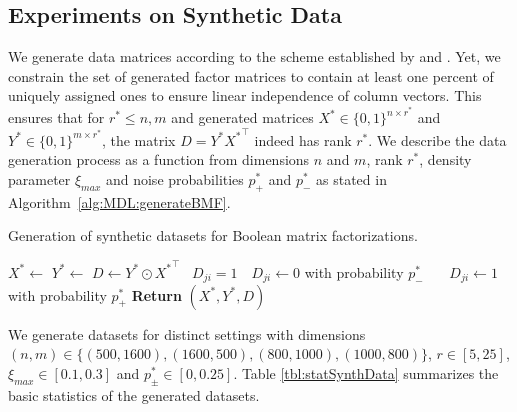 \subsection{Experiments on Synthetic Data} \label{sec:MDL:SynthData}
We generate data matrices according to the scheme established by \cite{miettinen2014mdl4bmf,karaev2015getting} and \cite{lucchese2014unifying}. Yet, we constrain the set of generated factor matrices to contain at least one percent of uniquely assigned ones to ensure linear independence of column vectors. This ensures that for $r^*\leq n,m$ and generated matrices $X^*\in\{0,1\}^{n\times r^*}$ and $Y^*\in\{0,1\}^{m\times r^*}$, the matrix $D=Y^* {X^*}^\top $ indeed has rank $r^*$. We describe the data generation process as a function from dimensions $n$ and $m$, rank $r^*$, density parameter $\xi_{max}$ and noise probabilities $p_+^*$ and $p_-^*$ as stated in Algorithm~\ref{alg:MDL:generateBMF}. 
\begin{algorithm}[t]
\caption{Generation of synthetic datasets for Boolean matrix factorizations.}
\begin{algorithmic}[1]
  	\State $X^*\gets$ 
  	\State $Y^*\gets$  
  	\State $D\gets Y^*\odot {X^*}^\top$
  	    \State \algorithmicif\ $D_{ji}=1$\ \algorithmicthen\ $D_{ji}\gets 0$ with probability $p_-^*$ 
  	    \State {}\ \algorithmicelse\ \ $D_{ji}\gets 1$ with probability $p_+^*$ 
    \EndFor
    \State \textbf{Return} $(X^*,Y^*,D)$
  \EndFunction
\end{algorithmic}
\label{alg:MDL:generateBMF}
\end{algorithm}
We generate datasets for distinct settings with dimensions $(n,m)\in\{(500,1600),\allowbreak(1600,500),\allowbreak(800,1000),\allowbreak(1000,800)\}$, $r\in[5,25]$, $\xi_{max}\in [0.1,0.3]$ and $p_\pm^*\in [0,0.25]$. 
Table \ref{tbl:statSynthData} summarizes the basic statistics of the generated datasets.   
